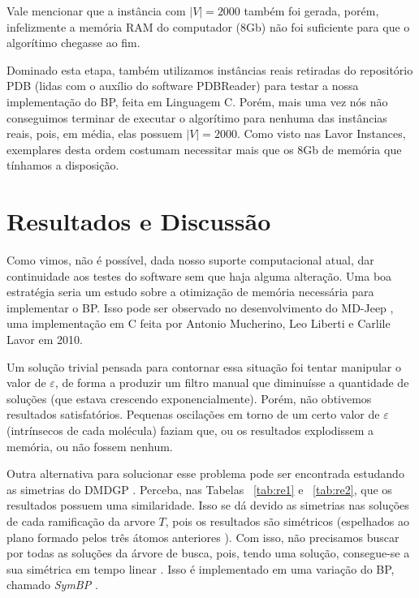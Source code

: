 \documentclass[a4paper,12pt]{article}
\begin{document}
	Vale mencionar que a instância com $|V| = 2000$ também foi gerada, porém, infelizmente a memória RAM do computador (8Gb) não foi suficiente para que o algorítimo chegasse ao fim. 
	
	Dominado esta etapa, também utilizamos instâncias reais retiradas do repositório PDB (lidas com o auxílio do software PDBReader) para testar a nossa implementação do BP, feita em Linguagem C. Porém, mais uma vez nós não conseguimos terminar de executar o algorítimo para nenhuma das instâncias reais, pois, em média, elas possuem $|V| = 2000$. Como visto nas Lavor Instances, exemplares desta ordem costumam necessitar mais que os 8Gb de memória que tínhamos a disposição. 
	
	\newpage
	\section{Resultados e Discussão}
	Como vimos, não é possível, dada nosso suporte computacional atual, dar continuidade aos testes do software sem que haja alguma alteração. Uma boa estratégia seria um estudo sobre a otimização de memória necessária para implementar o BP. Isso pode ser observado no desenvolvimento do MD-Jeep \cite{mucherino:BP}, uma implementação em C feita por Antonio Mucherino, Leo Liberti e Carlile Lavor em 2010.
	 
	Um solução trivial pensada para contornar essa situação foi tentar manipular o valor de $\varepsilon$, de forma a produzir um filtro manual que diminuísse a quantidade de soluções (que estava crescendo exponencialmente). Porém, não obtivemos resultados satisfatórios. Pequenas oscilações em torno de um certo valor de $\varepsilon$ (intrínsecos de cada molécula) faziam que, ou os resultados explodissem a memória, ou não fossem nenhum.
	
	Outra alternativa para solucionar esse problema pode ser encontrada estudando as simetrias do DMDGP \cite{fidalgotese} \cite{carlileGDandAplications}. Perceba, nas Tabelas ~\ref{tab:re1} e ~\ref{tab:re2}, que os resultados possuem uma similaridade. Isso se dá devido as simetrias nas soluções de cada ramificação da arvore $T$, pois os resultados são simétricos (espelhados ao plano formado pelos três átomos anteriores \cite{carlileBook31Coloquio}). Com isso, não precisamos buscar por todas as soluções da árvore de busca, pois, tendo uma solução, consegue-se a sua simétrica em tempo linear \cite{fidalgotese}. Isso é implementado em uma variação do BP, chamado \textit{SymBP} \cite{fidalgotese}.
	
\end{document}
